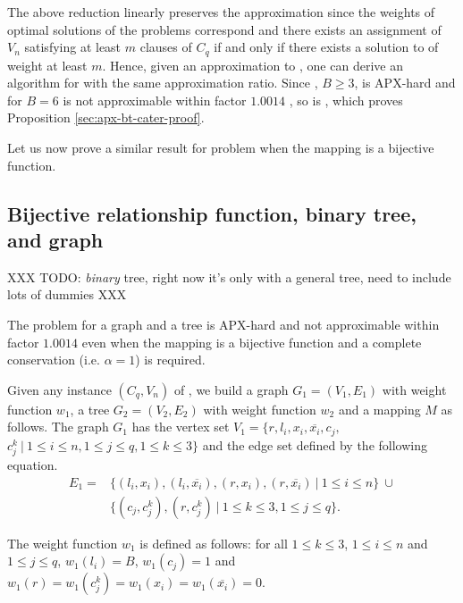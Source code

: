 		The above reduction linearly preserves the approximation since the weights of optimal solutions of the problems correspond and there exists an assignment of $V_n$ satisfying at least $m$ clauses of $C_q$ if and only if there exists a solution to \mwccs{} of weight at least $m$. Hence, given an approximation to \mwccs{}, one can derive an algorithm for \msat{} with the same approximation ratio. Since \msat{}, $B\geq 3$, is APX-hard \cite{papadimitriou1991optimization} and \msat{} for $B=6$ is not approximable within factor $1.0014$ \cite{berman1999some}, so is \mwccs{}, which proves Proposition \ref{sec:apx-bt-cater-proof}.

		Let us now prove a similar result for \mwccs{} problem when the mapping is a bijective function. 


		\subsection{Bijective relationship function, binary tree, and graph}
		\label{subsec:apx-bt-graph}

		XXX TODO: \emph{binary} tree, right now it's only with a general tree, need to include lots of dummies XXX


		\begin{proposition}\label{sec:apx-g-tree-proof}
  	  	  The \mwccs{} problem for a graph and a tree is APX-hard and not approximable within factor $1.0014$ even when the mapping is a bijective function and a complete conservation (i.e. $\alpha = 1$) is required.
		\end{proposition}

		Given any instance $(C_q,V_n)$ of \msat{}, we build a graph $G_1=(V_1,E_1)$ with weight function $w_1$, a tree $G_2=(V_2,E_2)$ with weight function $w_2$ and a mapping $M$ as follows. The graph $G_1$ has the vertex set $V_1=\{r, l_i, x_i, \overline{x_i}, c_j,$ $ c^k_j ~\vert~ 1\leq i\leq n, 1\leq j \leq q, 1\leq k \leq 3\}$ and the edge set defined by the following equation.
		\begin{align*}
		E_1= & \{(l_i,x_i), (l_i,\overline{x_i}), (r,x_i), (r,\overline{x_i}) ~\vert~ 1\leq i\leq n\} ~\cup  \\
 	 	 & \{(c_j,c_j^k), (r,c_j^k)  ~\vert~ 1\leq k \leq 3, 1\leq j \leq q\}.
		\end{align*}

		The weight function $w_1$ is defined as follows: for all $1\leq k \leq 3$, $1\leq i\leq n$ and $1\leq j \leq q$, $w_1(l_i)=B$, $w_1(c_j)=1$ and $w_1(r)=w_1(c_j^k)=w_1(x_i)=w_1(\overline{x_i})=0$.

